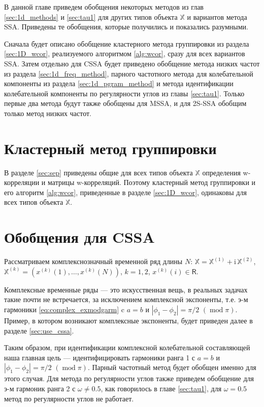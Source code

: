 \documentclass[specialist,
               substylefile = spbu.rtx,
               subf,href,colorlinks=true, 12pt]{disser}
\def\mod{\mathop{\mathrm{mod}}}
\newcommand{\I}{\mathrm{i}}
\begin{document}
В данной главе приведем обобщения некоторых методов из глав \ref{sec:1d_methods} и \ref{sec:tau1} для других типов объекта $\mathbb{X}$ и вариантов метода SSA. Приведены те обобщения, которые получились и  показались разумными.

Сначала будет описано обобщение кластерного метода группировки из раздела \ref{sec:1D_wcor}, реализуемого алгоритмом \ref{alg:wcor}, сразу для всех вариантов SSA.
Затем отдельно для CSSA будет приведено обобщение метода низких частот из раздела \ref{sec:1d_freq_method}, парного частотного метода для колебательной компоненты из раздела \ref{sec:1d_pgram_method} и метода идентификации колебательной компоненты по регулярности углов из главы \ref{sec:tau1}.
Только первые два метода будут также обобщены для MSSA, и для 2S-SSA обобщим только метод низких частот.

\section{Кластерный метод группировки} 
В разделе \ref{sec:sep} приведены общие для всех типов объекта $\mathbb{X}$ определения w-корреляции и матрицы w-корреляций. Поэтому кластерный метод группировки и его алгоритм \ref{alg:wcor}, приведенные в разделе \ref{sec:1D_wcor}, одинаковы для всех типов объекта $\mathbb{X}$.

\section{Обобщения для CSSA}
Рассматриваем комплекснозначный временной ряд длины $N$: $\mathbb{X}=\mathbb{X}^{(1)} + \I \,\mathbb{X}^{(2)}$, $\mathbb{X}^{(k)}= \left(x^{(k)}(1),\ldots,x^{(k)}(N)\right)$, $k=1,2$, $x^{(k)}(i) \in \mathsf{R}$.

Комплексные временные ряды --- это искусственная вещь, в реальных задачах такие почти не встречается, за исключением комплексной экспоненты, т.е. э-м гармоники \eqref{eq:complex_exmodgarm} c $a=b$ и $|\phi_1 - \phi_2| = \pi/2 \,\,(\mod \pi)$. Пример, в котором возникают комплексные экспоненты, будет приведен далее в разделе \ref{sec:use_cssa}.

Таким образом, при идентификации комплексной колебательной составляющей наша главная цель --- идентифицировать гармоники ранга 1 с $a=b$ и $|\phi_1 - \phi_2| = \pi/2 \,\,(\mod \pi)$.
Парный частотный метод будет обобщен именно для этого случая. Для метода по регулярности углов также приведем обобщение для э-м гармоник ранга 2 с $\omega \not = 0.5$, как говорилось в главе \ref{sec:tau1}, для $\omega=0.5$ метод по регулярности углов не работает. 
\end{document}
